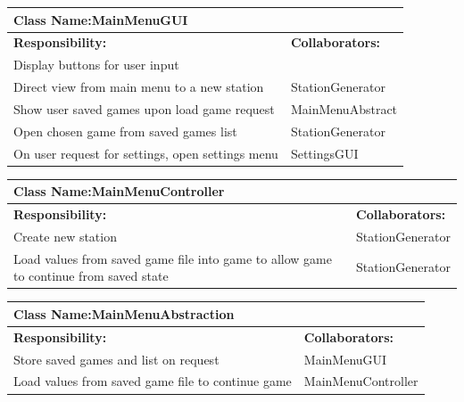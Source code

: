 \documentclass[]{article}
\begin{document}
	\begin{table}[ht]
		\centering
		\begin{tabular}{|p{5cm}|p{5cm}|}
		\hline 
		 \multicolumn{2}{|l|}{\textbf{Class Name:}MainMenuGUI} \\
		\hline
		\textbf{Responsibility:} & \textbf{Collaborators:} \\
		\hline
		Display buttons for user input & \\
		\hline
		Direct view from main menu to a new station & StationGenerator\\
		\hline
		Show user saved games upon load game request & MainMenuAbstract \\
		\hline
		Open chosen game from saved games list  & StationGenerator \\
		\hline
		On user request for settings, open settings menu & SettingsGUI\\
		\hline
		\end{tabular}
	\end{table}
	\begin{table}[ht]
		\centering
		\begin{tabular}{|p{5cm}|p{5cm}|}
		\hline 
		 \multicolumn{2}{|l|}{\textbf{Class Name:}MainMenuController} \\
		\hline
		\textbf{Responsibility:} & \textbf{Collaborators:} \\
		\hline
		Create new station & StationGenerator\\
		\hline
		Load values from saved game file into game to allow game to continue from saved state & StationGenerator\\
		\hline
		\end{tabular}
	\end{table}
	\begin{table}[ht]
		\centering
		\begin{tabular}{|p{5cm}|p{5cm}|}
		\hline 
		 \multicolumn{2}{|l|}{\textbf{Class Name:}MainMenuAbstraction} \\
		\hline
		\textbf{Responsibility:} & \textbf{Collaborators:} \\
		\hline
		Store saved games and list on request & MainMenuGUI\\
		\hline
		Load values from saved game file to continue game & MainMenuController\\
		\hline
		\end{tabular}
	\end{table}
\end{document}
